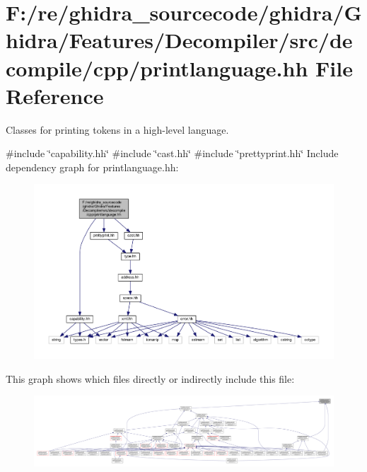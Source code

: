 \hypertarget{printlanguage_8hh}{}\section{F\+:/re/ghidra\+\_\+sourcecode/ghidra/\+Ghidra/\+Features/\+Decompiler/src/decompile/cpp/printlanguage.hh File Reference}
\label{printlanguage_8hh}


Classes for printing tokens in a high-\/level language.  


{\ttfamily \#include \char`\"{}capability.\+hh\char`\"{}}\newline
{\ttfamily \#include \char`\"{}cast.\+hh\char`\"{}}\newline
{\ttfamily \#include \char`\"{}prettyprint.\+hh\char`\"{}}\newline
Include dependency graph for printlanguage.\+hh\+:
\nopagebreak
\begin{figure}[H]
\begin{center}
\leavevmode
\includegraphics[width=350pt]{printlanguage_8hh__incl}
\end{center}
\end{figure}
This graph shows which files directly or indirectly include this file\+:
\nopagebreak
\begin{figure}[H]
\begin{center}
\leavevmode
\includegraphics[width=350pt]{printlanguage_8hh__dep__incl}
\end{center}
\end{figure}
